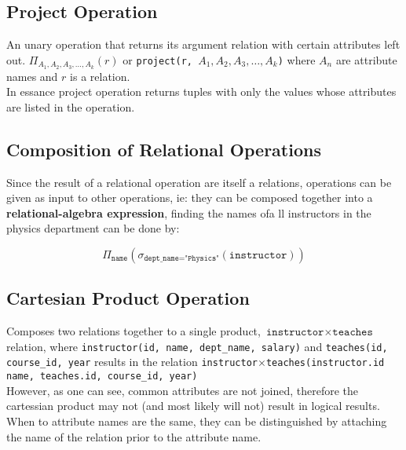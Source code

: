 \documentclass[11pt,a4paper,twocolumn]{book}
\begin{document}
\subsection{Project Operation}

An unary operation that returns its argument relation with certain attributes left out. $\Pi_{A_1, A_2, A_3, \dots, A_k}(r)$ or \texttt{project(r, {$A_1, A_2, A_3, \dots, A_k$})} where $A_n$ are attribute names and $r$ is a relation.\\

In essance project operation returns tuples with only the values whose attributes are listed in the operation.\\

\subsection{Composition of Relational Operations}

Since the result of a relational operation are itself a relations, operations can be given as input to other operations, ie: they can be composed together into a \textbf{relational-algebra expression}, finding the names ofa ll instructors in the physics department can be done by:

\begin{equation}
\Pi_{\texttt{name}}(\sigma_{\texttt{dept\_name} = \texttt{"Physics"}}(\texttt{instructor}))
\end{equation}

\subsection{Cartesian Product Operation}

Composes two relations together to a single product, $\texttt{instructor} \times \texttt{teaches}$ relation, where \texttt{instructor(id, name, dept\_name, salary)} and \texttt{teaches(id, course\_id, year} results in the relation \texttt{instructor$\times$teaches(instructor.id name, teaches.id, course\_id, year)}\\

However, as one can see, common attributes are not joined, therefore the cartessian product may not (and most likely will not) result in logical results.\\

When to attribute names are the same, they can be distinguished by attaching the name of the relation prior to the attribute name.\\
\end{document}
